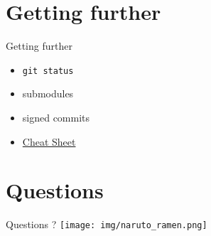 \documentclass{beamer}
\begin{document}
\section{Getting further}
\begin{frame}{Getting further}
    \begin{itemize}
        \item<1-> \lstinline{git status}
        \item<2-> submodules
        \item<3-> signed commits
        \item<4-> \href{https://education.github.com/git-cheat-sheet-education.pdf}{Cheat Sheet}
    \end{itemize}
    
\end{frame}

\section{Questions}
\begin{frame}{Questions ?}
    \centering
    \texttt{[image: img/naruto\_ramen.png]}
\end{frame}
\end{document}
